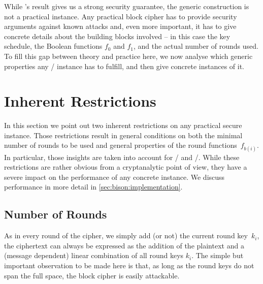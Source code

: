 While \citeauthor{AC:Tessaro15}'s result gives us a strong security guarantee, the generic construction is not a practical instance.
Any practical block cipher has to provide security arguments against known attacks and, even more important, it has to give concrete details about the building blocks involved -- in this case the key schedule, the Boolean functions $f_0$ and $f_1$, and the actual number of rounds used.
To fill this gap between theory and practice here, we now analyse which generic properties any \WSN/ instance has to fulfill, and then give concrete instances of it.

\section{Inherent Restrictions}\label{bison:sec:restrictions}
In this section we point out two inherent restrictions on any practical secure instance.
Those restrictions result in general conditions on both the minimal number of rounds to be used and general properties of the round functions~$f_{b(i)}$.
In particular, those insights are taken into account for \bison/ and \wisent/.
While these restrictions are rather obvious from a cryptanalytic point of view, they have a severe impact on the performance of any concrete instance.
We discuss performance in more detail in \cref{sec:bison:implementation}.

\subsection{Number of Rounds}
As in every round of the cipher, we simply add (or not) the current round key~$k_i$, the ciphertext can always be expressed as the addition of the plaintext and a (message dependent) linear combination of all round keys $k_i$.
The simple but important observation to be made here is that, as long as the round keys do not span the full space, the block cipher is easily attackable.

